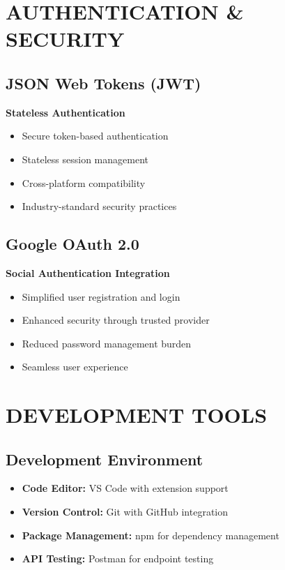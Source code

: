 \section{AUTHENTICATION \& SECURITY}

\subsection{JSON Web Tokens (JWT)}

\textbf{Stateless Authentication}

\begin{itemize}
\item Secure token-based authentication
\item Stateless session management
\item Cross-platform compatibility
\item Industry-standard security practices
\end{itemize}

\subsection{Google OAuth 2.0}

\textbf{Social Authentication Integration}

\begin{itemize}
\item Simplified user registration and login
\item Enhanced security through trusted provider
\item Reduced password management burden
\item Seamless user experience
\end{itemize}

\section{DEVELOPMENT TOOLS}

\subsection{Development Environment}

\begin{itemize}
\item \textbf{Code Editor:} VS Code with extension support
\item \textbf{Version Control:} Git with GitHub integration
\item \textbf{Package Management:} npm for dependency management
\item \textbf{API Testing:} Postman for endpoint testing
\end{itemize}

